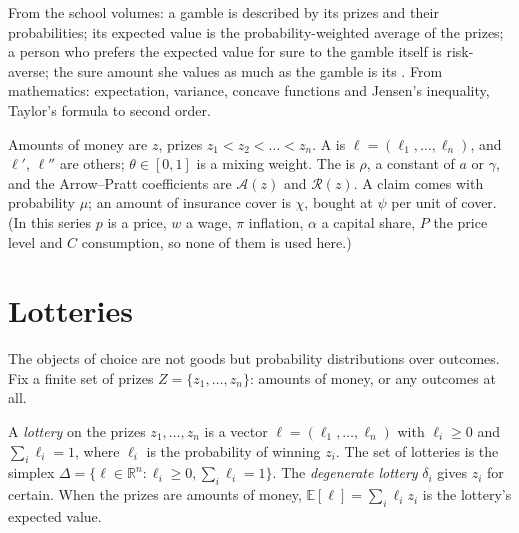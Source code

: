 \begin{recall}
From the school volumes: a gamble is described by its prizes and their probabilities; its expected
value is the probability-weighted average of the prizes; a person who prefers the expected value for
sure to the gamble itself is risk-averse; the sure amount she values as much as the gamble is its
. From mathematics: expectation, variance, concave functions and Jensen's
inequality, Taylor's formula to second order.
\end{recall}

\begin{notation}\label{not:b2:expected-utility:symbols}
Amounts of money are $z$, prizes $z_1 < z_2 < \dots < z_n$. A  is $\ell = (\ell_1, \dots,
\ell_n)$, and $\ell'$, $\ell''$ are others; $\theta \in [0,1]$ is a mixing weight. The  is
$\rho$, a constant of  $a$ or $\gamma$, and the Arrow--Pratt coefficients are
$\mathcal{A}(z)$ and $\mathcal{R}(z)$. A claim comes with probability $\mu$; an amount of
insurance cover is $\chi$, bought at $\psi$ per unit of cover. (In this series $p$ is a price, $w$ a wage, $\pi$ inflation,
$\alpha$ a capital share, $P$ the price level and $C$ consumption, so none of them is used here.)
\end{notation}

\section{Lotteries}\label{sec:b2:expected-utility:lotteries}

The objects of choice are not goods but probability distributions over outcomes. Fix a finite set of
prizes $Z = \{z_1, \dots, z_n\}$: amounts of money, or any outcomes at all.

\begin{definition}[Lottery]\label{def:b2:expected-utility:lottery}
A \emph{lottery} on the prizes $z_1, \dots, z_n$ is a vector $\ell = (\ell_1, \dots,
\ell_n)$ with $\ell_i \ge 0$ and $\sum_i \ell_i = 1$, where $\ell_i$ is the probability of winning
$z_i$. The set of lotteries is the simplex $\Delta = \{\ell \in \mathbb{R}^n : \ell_i \ge 0, \sum_i
\ell_i = 1\}$. The \emph{degenerate lottery} $\delta_i$ gives $z_i$ for certain. When the prizes are
amounts of money, $\mathbb{E}[\ell] = \sum_i \ell_i z_i$ is the lottery's expected value.
\end{definition}

